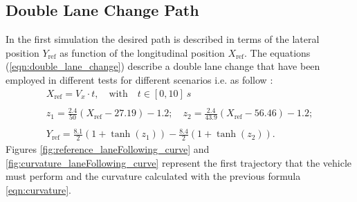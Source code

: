 \subsection{Double Lane Change Path}
In the first simulation the desired path is described in terms of the lateral position $Y_\text{ref}$ as function of the
longitudinal position $X_\text{ref}$. The equations (\ref{eqn:double_lane_change}) describe a double lane change that have
been employed in different tests for different scenarios i.e. \cite{Falcone2007a} \cite{Falcone2007b} \cite{Falcone2006} as follow :
\begin{equation}
\label{eqn:double_lane_change}
\begin{array}{cccc}
X_\text{ref}=V_x\cdot t, \quad\text{with}\quad t\in[0,10]\SI{}{s} \\\\
z_1 = \displaystyle
\frac{2.4}{50}(X_\text{ref}-27.19)-1.2;\quad
z_2=\displaystyle\frac{2.4}{43.9}(X_\text{ref}-56.46)-1.2;\\\\
Y_\text{ref}=\displaystyle\frac{8.1}{2}(1+\tanh(z_1)) - \frac{8.4}{2}(1+\tanh(z_2)).
\end{array}
\end{equation}
Figures \ref{fig:reference_laneFollowing_curve} and \ref{fig:curvature_laneFollowing_curve} represent the first trajectory that the vehicle must perform and the curvature calculated with the previous formula \ref{eqn:curvature}. 

